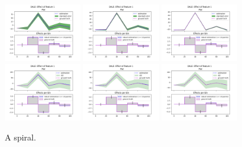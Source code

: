 \documentclass[wcp]{jmlr}
\newcommand{\1}{\mathbbm{1}}
\begin{document}
\begin{figure}[htp]
\begin{center}
  \includegraphics[width=0.3\textwidth]{example_1/im_1.png}
  \includegraphics[width=0.3\textwidth]{example_1/im_3.png}
  \includegraphics[width=0.3\textwidth]{example_1/im_5.png}\\
  \includegraphics[width=0.3\textwidth]{example_1/im_2.png}
  \includegraphics[width=0.3\textwidth]{example_1/im_4.png}
  \includegraphics[width=0.3\textwidth]{example_1/im_6.png}
\caption{A spiral.}\label{fig:edfd}
\end{center}
\end{figure}
\end{document}
